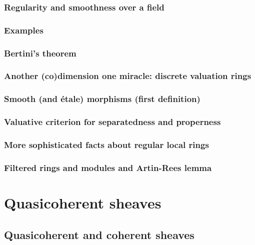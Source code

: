 \documentclass[11pt]{book} %
\begin{document}
\section{Regularity and smoothness over a field}
\section{Examples}
\section{Bertini's theorem}
\section{Another (co)dimension one miracle: discrete valuation rings}
\section{Smooth (and {\'e}tale) morphisms (first definition)}
\section{Valuative criterion for separatedness and properness}
\section{More sophisticated facts about regular local rings}
\section{Filtered rings and modules and Artin-Rees lemma}
\part{Quasicoherent sheaves}
\chapter{Quasicoherent and coherent sheaves}
\end{document}
